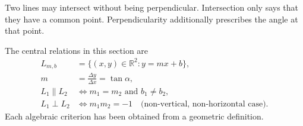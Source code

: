 \begin{remarkbox}
Two lines may intersect without being perpendicular. Intersection only says
that they have a common point. Perpendicularity additionally prescribes the
angle at that point.
\end{remarkbox}

\begin{summarybox}
The central relations in this section are
\[
\begin{aligned}
L_{m,b}&=\{(x,y)\in\mathbb{R}^2:y=mx+b\},\\[2mm]
m&=\frac{\Delta y}{\Delta x}=\tan\alpha,\\[2mm]
L_1\parallel L_2&\iff m_1=m_2\text{ and }b_1\neq b_2,\\[2mm]
L_1\perp L_2&\iff m_1m_2=-1
\quad\text{(non-vertical, non-horizontal case).}
\end{aligned}
\]
Each algebraic criterion has been obtained from a geometric definition.
\end{summarybox}
